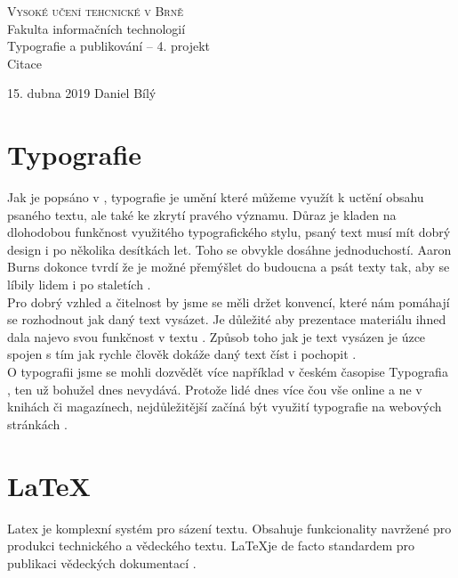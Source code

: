 \documentclass[a4paper, 11pt]{article}
\begin{document}
\begin{center}
\thispagestyle{empty}
\Huge{\textsc{Vysoké učení tehcnické v Brně}\\
\Huge{Fakulta informačních technologií}}\\
\LARGE{Typografie a publikování – 4. projekt}\\ 
\Huge{Citace} \\
\end{center}
\LARGE{15. dubna 2019 \hfill Daniel Bílý}


\normalsize
\pagebreak
\setcounter{page}{1}


\section{Typografie}
Jak je popsáno v \cite{Bringhurst}, typografie je umění které můžeme využít k uctění obsahu psaného textu, ale také ke zkrytí pravého významu. Důraz je kladen na dlohodobou funkčnost využitého typografického stylu, psaný text musí mít dobrý design i po několika desítkách let. Toho se obvykle dosáhne jednoduchostí. Aaron Burns dokonce tvrdí že je možné přemýšlet do budoucna a psát texty tak, aby se líbily lidem i po staletích \cite{Aaron}. \\

Pro dobrý vzhled a čitelnost by jsme se měli držet konvencí, které nám pomáhají se rozhodnout jak daný text vysázet. Je důležité aby prezentace materiálu ihned dala najevo svou funkčnost v textu \cite{Mittel}. Způsob toho jak je text vysázen je úzce spojen s tím jak rychle člověk dokáže daný text číst i pochopit \cite{Journal}. \\

O typografii jsme se mohli dozvědět více například v českém časopise Typografia \cite{typografia}, ten už bohužel dnes nevydává. Protože lidé dnes více čou vše online a ne v knihách či magazínech, nejdůležitější začíná být využití typografie na webových stránkách \cite{web}.


\section{\LaTeX}
Latex je komplexní systém pro sázení textu. Obsahuje funkcionality navržené pro produkci technického a vědeckého textu. \LaTeX je de facto standardem pro publikaci vědeckých dokumentací \cite{latex_project}. \\
\end{document}
